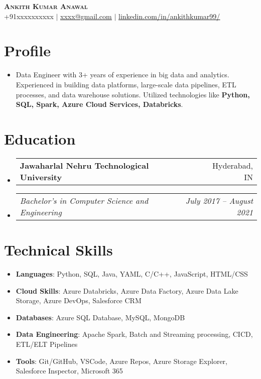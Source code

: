 \documentclass[a4paper,20pt]{article}
\makeatletter
\newcommand{\resumeSectionListStart}{\begin{itemize}[leftmargin=*,label={}]}
\newcommand{\resumeSectionListEnd}{\end{itemize}}
\newcommand{\resumeSubheading}[2]{
    \vspace{-1pt}\item
    \begin{tabular*}{0.97\textwidth}{l@{\extracolsep{\fill}}r}
        \textbf{#1} & #2 \\
    \end{tabular*}\vspace{-5pt}
}
\newcommand{\resumeSubheadingTitle}[2]{
  \vspace{-1pt}\item
    \begin{tabular*}{0.97\textwidth}{l@{\extracolsep{\fill}}r}
      \textit{#1} & \textit{#2} \\
    \end{tabular*}\vspace{-5pt}
}
\newcommand{\resumeItemWithTitle}[2]{
    \item\small{
        \textbf{#1}{: #2 \vspace{-2pt}}
    }\vspace{-3pt}
}
\makeatother
\begin{document}

\begin{center}
    \textbf{{\Huge \scshape Ankith Kumar Anawal}} \\
    \vspace{1pt}
    \small +91xxxxxxxxxx $|$ \href{mailto:}{\underline{xxxx@gmail.com}} $|$ \href{https://linkedin.com/in/ankithkumar99/}{\underline{linkedin.com/in/ankithkumar99/}}
\end{center}



\section{Profile}
    \resumeSectionListStart
        \item
        Data Engineer with 3+ years of experience in big data and analytics. Experienced in building data platforms, large-scale data pipelines, ETL processes, and data warehouse solutions. Utilized technologies like \textbf{Python, SQL, Spark, Azure Cloud Services, Databricks}.
        \vspace{-5pt}
    \resumeSectionListEnd



\section{Education}
    \resumeSectionListStart
        \resumeSubheading
            {Jawaharlal Nehru Technological University}{Hyderabad, IN}
            \resumeSubheadingTitle
                {Bachelor's in Computer Science and Engineering}{July 2017 -- August 2021}
    \resumeSectionListEnd 

        

\section{Technical Skills}
    \resumeSectionListStart
        \resumeItemWithTitle{Languages}{Python, SQL, Java, YAML, C/C++, JavaScript, HTML/CSS}
        \resumeItemWithTitle{Cloud Skills}{Azure Databricks, Azure Data Factory, Azure Data Lake Storage, Azure DevOps, Salesforce CRM}
        \resumeItemWithTitle{Databases}{Azure SQL Database, MySQL, MongoDB}
        \resumeItemWithTitle{Data Engineering}{Apache Spark, Batch and Streaming processing, CICD, ETL/ELT Pipelines}
        \resumeItemWithTitle{Tools}{Git/GitHub, VSCode, Azure Repos, Azure Storage Explorer, Salesforce Inspector, Microsoft 365}
    \resumeSectionListEnd
\end{document}
